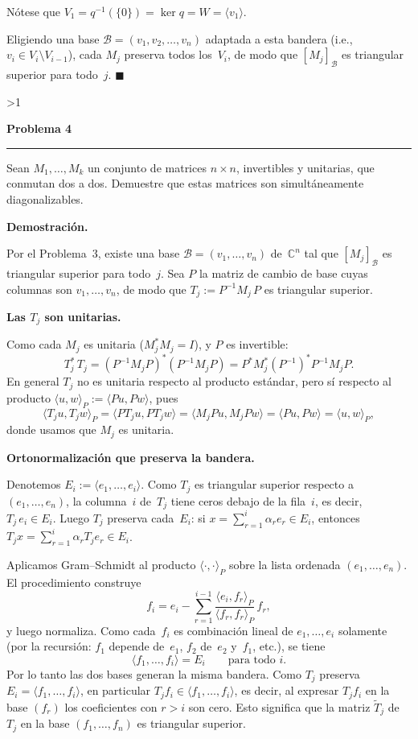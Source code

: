 \documentclass[10pt,a4paper]{article}
\newcommand{\CC}{\mathbb{C}}
\newcommand{\inlinehead}[2][repblue]{%
  \par\smallskip
  {\color{#1}\bfseries #2.}\hspace{0.45em}%
}
\newcounter{probcnt}
\newcommand{\problem}[2]{%
  \stepcounter{probcnt}%
  \ifnum\value{probcnt}>1\newpage\fi
  \par\vspace{0.25em}
  {\large\bfseries\color{repblue} Problema #1}\par
  {\color{repline}\rule{\linewidth}{0.55pt}}\par
  \begin{tcolorbox}[
    breakable,
    colback=white,
    colframe=repline,
    borderline west={1.6pt}{0pt}{repteal},
    left=0.7em,
    right=0.7em,
    top=0.35em,
    bottom=0.3em,
    before skip=0.35em,
    after skip=0.45em
  ]
    #2
  \end{tcolorbox}
}
\begin{document}
Nótese que $V_1=q^{-1}(\{0\})=\ker q=W=\langle v_1\rangle$.

Eligiendo una base $\mathcal{B}=(v_1,v_2,\dots,v_n)$ adaptada a esta bandera
(i.e., $v_i\in V_i\setminus V_{i-1}$), cada $M_j$ preserva todos los~$V_i$,
de modo que $[M_j]_{\mathcal{B}}$ es triangular superior para todo~$j$.
\hfill$\blacksquare$

\problem{4}{%
Sean $M_1,\dots,M_k$ un conjunto de matrices $n\times n$, invertibles y
unitarias, que conmutan dos a dos. Demuestre que estas matrices son
simultáneamente diagonalizables.
}

\inlinehead{Demostración}
Por el Problema~3, existe una base $\mathcal{B}=(v_1,\dots,v_n)$ de~$\CC^n$
tal que $[M_j]_{\mathcal{B}}$ es triangular superior para todo~$j$.
Sea $P$ la matriz de cambio de base cuyas columnas son $v_1,\dots,v_n$, de
modo que $T_j:=P^{-1}M_j\,P$ es triangular superior.

\inlinehead[repteal]{Las $T_j$ son unitarias}
Como cada $M_j$ es unitaria ($M_j^*M_j=I$), y $P$ es invertible:
\[
  T_j^*\,T_j = (P^{-1}M_jP)^*(P^{-1}M_jP)
             = P^*M_j^*(P^{-1})^*P^{-1}M_jP.
\]
En general $T_j$ no es unitaria respecto al producto estándar, pero sí
respecto al producto $\langle u,w\rangle_P:=\langle Pu,Pw\rangle$, pues
\[
  \langle T_j u,T_j w\rangle_P
    = \langle PT_j u,PT_j w\rangle
    = \langle M_j Pu,M_j Pw\rangle
    = \langle Pu,Pw\rangle
    = \langle u,w\rangle_P,
\]
donde usamos que $M_j$ es unitaria.

\inlinehead[repteal]{Ortonormalización que preserva la bandera}
Denotemos $E_i:=\langle e_1,\dots,e_i\rangle$. Como $T_j$ es triangular
superior respecto a $(e_1,\dots,e_n)$, la columna~$i$ de~$T_j$ tiene ceros
debajo de la fila~$i$, es decir, $T_j\,e_i\in E_i$. Luego $T_j$ preserva
cada~$E_i$: si $x=\sum_{r=1}^{i}\alpha_r e_r\in E_i$, entonces
$T_j x=\sum_{r=1}^{i}\alpha_r T_j e_r\in E_i$.

Aplicamos Gram--Schmidt al producto $\langle\cdot,\cdot\rangle_P$ sobre la
lista ordenada $(e_1,\dots,e_n)$. El procedimiento construye
\[
  f_i = e_i - \sum_{r=1}^{i-1}
    \frac{\langle e_i,f_r\rangle_P}{\langle f_r,f_r\rangle_P}\,f_r,
\]
y luego normaliza. Como cada~$f_i$ es combinación lineal de
$e_1,\dots,e_i$ solamente (por la recursión: $f_1$ depende de~$e_1$,
$f_2$ de~$e_2$ y~$f_1$, etc.), se tiene
\[
  \langle f_1,\dots,f_i\rangle = E_i
  \qquad\text{para todo }i.
\]
Por lo tanto las dos bases generan la misma bandera. Como $T_j$ preserva
$E_i=\langle f_1,\dots,f_i\rangle$, en particular
$T_j f_i\in\langle f_1,\dots,f_i\rangle$, es decir, al expresar $T_j f_i$
en la base $(f_r)$ los coeficientes con $r>i$ son cero. Esto significa que
la matriz $\widetilde{T}_j$ de~$T_j$ en la base $(f_1,\dots,f_n)$ es
triangular superior.
\end{document}
